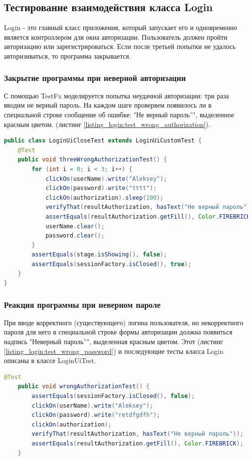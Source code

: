 \documentclass[a4paper,12pt]{article}
\begin{document}
\newpage\subsection{Тестирование взаимодействия класса Login}
Login - это главный класс приложения, который запускает его и одновременно является контроллером для окна авторизации. Пользователь должен пройти авторизацию или зарегистрироваться. Если после третьей попытки не удалось авторизиваться, то программа закрывается.
\subsubsection{Закрытие программы при неверной авторизации}
С помощью TestFx моделируется попытка неудачной авторизации: три раза вводим не верный пароль. На каждом шаге проверяем появилось ли в специальной строке сообщение об ошибке: "Не верный пароль''", выделенное красным цветом. (листинг \ref{listing_login:test_wrong_authorization}).
\begin{lstlisting}[language=java, caption=Тестирование неверной авторизации, label=listing_login:test_wrong_authorization]
public class LoginUiCloseTest extends LoginUiCustomTest {
    @Test
    public void threeWrongAuthorizationTest() {
        for (int i = 0; i < 3; i++) {
            clickOn(userName).write("Aleksey");
            clickOn(password).write("tttt");
            clickOn(authorization).sleep(100);
            verifyThat(resultAuthorization, hasText("Не верный пароль"));
            assertEquals(resultAuthorization.getFill(), Color.FIREBRICK);
            userName.clear();
            password.clear();
        }
        assertEquals(stage.isShowing(), false);
        assertEquals(sessionFactory.isClosed(), true);
    }
}
\end{lstlisting}

\subsubsection{Реакция программы при неверном пароле}
При вводе корректного (существующего) логина пользователя, но некорректного пароля для него в специальной строке формы авторизации должна появиться надпись "Неверный пароль''", выделенная красным цветом. Этот (листинг \ref{listing_login:test_wrong_password}) и последующие тесты класса Login описаны в классе LoginUiTest.

\begin{lstlisting}[language=java, caption=Тестирование ввода неверного пароля, label=listing_login:test_wrong_password]      
    @Test
    public void wrongAuthorizationTest() {
        assertEquals(sessionFactory.isClosed(), false);
        clickOn(userName).write("Aleksey");
        clickOn(password).write("retdfgdfh");
        clickOn(authorization);
        verifyThat(resultAuthorization, hasText("Не верный пароль"));
        assertEquals(resultAuthorization.getFill(), Color.FIREBRICK);
    }
\end{lstlisting}
\end{document}
